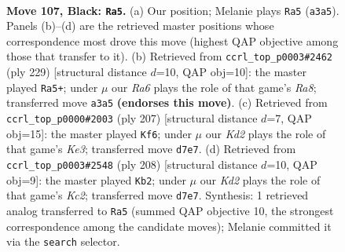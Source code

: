 \documentclass[11pt]{article}
\begin{document}
\clearpage

\begin{figure}[p]\centering
\begin{subfigure}{0.46\textwidth}\centering
\resizebox{\linewidth}{!}{%
\newchessgame
\chessboard[
  setfen={8/3k4/4p1R1/4P3/1R3P2/r7/5K2/8 b - - 0 107},
  showmover=false,
  pgfstyle=straightmove, color=movearrow, markmove={a3-a5}
]}
\caption{}
\end{subfigure}\hfill
\begin{subfigure}{0.46\textwidth}\centering
\resizebox{\linewidth}{!}{%
\newchessgame
\chessboard[
  setfen={8/6k1/1R5p/5K2/5P2/6P1/8/r7 b - - 46 115},
  showmover=false,
  pgfstyle=straightmove, color=movearrow, markmove={a1-a5}
]}
\caption{}
\end{subfigure}
\\[4pt]
\begin{subfigure}{0.46\textwidth}\centering
\resizebox{\linewidth}{!}{%
\newchessgame
\chessboard[
  setfen={8/8/4k3/1R3p2/5P2/4P1K1/r7/8 b - - 86 104},
  showmover=false,
  pgfstyle=straightmove, color=movearrow, markmove={e6-f6}
]}
\caption{}
\end{subfigure}\hfill
\begin{subfigure}{0.46\textwidth}\centering
\resizebox{\linewidth}{!}{%
\newchessgame
\chessboard[
  setfen={8/8/3k4/2p5/3p4/1P5r/2K1R3/8 w - - 82 105},
  showmover=false,
  pgfstyle=straightmove, color=movearrow, markmove={c2-b2}
]}
\caption{}
\end{subfigure}
\caption{\textbf{Move 107, Black: \texttt{Ra5}.} (a) Our position; Melanie plays \texttt{Ra5} (\texttt{a3a5}). Panels (b)--(d) are the retrieved master positions whose correspondence most drove this move (highest QAP objective among those that transfer to it). (b) Retrieved from \texttt{ccrl\_top\_p0003\#2462} (ply 229) [structural distance $d$=10, QAP obj=10]: the master played \texttt{Ra5+}; under $\mu$ our \emph{Ra6} plays the role of that game's \emph{Ra8}; transferred move \texttt{a3a5} \textbf{(endorses this move)}. (c) Retrieved from \texttt{ccrl\_top\_p0000\#2003} (ply 207) [structural distance $d$=7, QAP obj=15]: the master played \texttt{Kf6}; under $\mu$ our \emph{Kd2} plays the role of that game's \emph{Ke3}; transferred move \texttt{d7e7}. (d) Retrieved from \texttt{ccrl\_top\_p0003\#2548} (ply 208) [structural distance $d$=10, QAP obj=9]: the master played \texttt{Kb2}; under $\mu$ our \emph{Kd2} plays the role of that game's \emph{Kc2}; transferred move \texttt{d7e7}. Synthesis: 1 retrieved analog transferred to \texttt{Ra5} (summed QAP objective 10, the strongest correspondence among the candidate moves); Melanie committed it via the \texttt{search} selector.}
\label{fig:thought-m213}
\end{figure}
\end{document}
